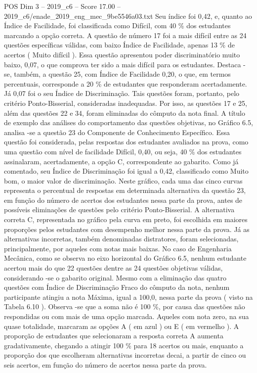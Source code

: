 \begin{textsample}{POS Dim 3 – 2019\_c6 – Score 17.00 – 2019\_c6/enade\_2019\_eng\_mec\_9be5546a03.txt}
Seu índice foi 0,42, e, quanto ao Índice de Facilidade, foi classificada como Difícil, com 40 \% dos estudantes marcando a opção correta.
A questão de número 17 foi a mais difícil entre as 24 questões específicas válidas, com baixo Índice de Facilidade, apenas 13 \% de acertos ( Muito difícil ).
Essa questão apresentou poder discriminatório muito baixo, 0,07, o que comprova ter sido a mais difícil para os estudantes.
Destaca -se, também, a questão 25, com Índice de Facilidade 0,20, o que, em termos percentuais, corresponde a 20 \% de estudantes que responderam acertadamente.
Já 0,07 foi o seu Índice de Discriminação.
Tais questões foram, portanto, pelo critério Ponto-Bisserial, consideradas inadequadas.
Por isso, as questões 17 e 25, além das questões 22 e 34, foram eliminadas do cômputo da nota final.
A título de exemplo das análises do comportamento das questões objetivas, no Gráfico 6.5, analisa -se a questão 23 do Componente de Conhecimento Específico.
Essa questão foi considerada, pelas respostas dos estudantes avaliados na prova, como uma questão com nível de facilidade Difícil, 0,40, ou seja, 40 \% dos estudantes assinalaram, acertadamente, a opção C, correspondente ao gabarito.
Como já comentado, seu Índice de Discriminação foi igual a 0,42, classificado como Muito bom, o maior valor de discriminação.
Neste gráfico, cada uma das cinco curvas representa o percentual de respostas em determinada alternativa da questão 23, em função do número de acertos dos estudantes nessa parte da prova, antes de possíveis eliminações de questões pelo critério Ponto-Bisserial.
A alternativa correta C, representada no gráfico pela curva em preto, foi escolhida em maiores proporções pelos estudantes com desempenho melhor nessa parte da prova.
Já as alternativas incorretas, também denominadas distratores, foram selecionadas, principalmente, por aqueles com notas mais baixas.
No caso de Engenharia Mecânica, como se observa no eixo horizontal do Gráfico 6.5, nenhum estudante acertou mais do que 22 questões dentre as 24 questões objetivas válidas, considerando -se o gabarito original.
Mesmo com a eliminação das quatro questões com Índice de Discriminação Fraco do cômputo da nota, nenhum participante atingiu a nota Máxima, igual a 100,0, nessa parte da prova ( visto na Tabela 6.10 ).
Observa -se que a soma não é 100 \%, por causa das questões não respondidas ou com mais de uma opção marcada.
Aqueles com nota zero, na sua quase totalidade, marcaram as opções A ( em azul ) ou E ( em vermelho ).
A proporção de estudantes que selecionaram a resposta correta A aumenta gradativamente, chegando a atingir 100 \% para 18 acertos ou mais, enquanto a proporção dos que escolheram alternativas incorretas decai, a partir de cinco ou seis acertos, em função do número de acertos nessa parte da prova.

\end{textsample}
